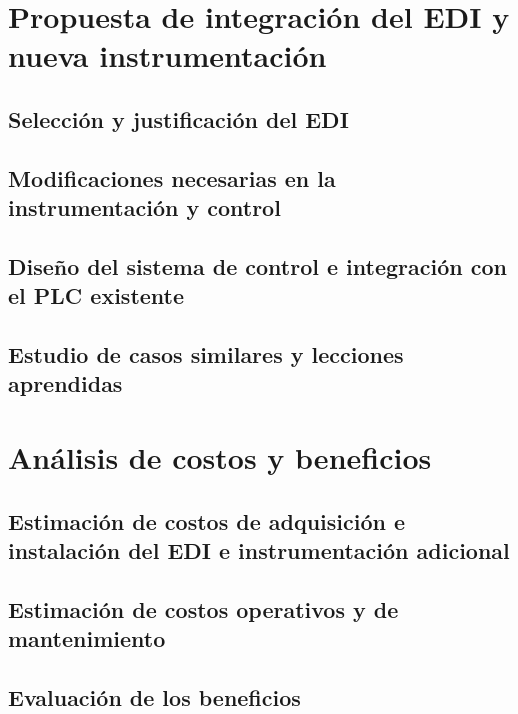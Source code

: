 \documentclass[
	spanish, %
	letterpaper, oneside
]{book}
\begin{document}
\templateIndex

\templateFinalcfg










\chapter{Propuesta de integración del EDI y nueva instrumentación}
\section{Selección y justificación del EDI}
\section{Modificaciones necesarias en la instrumentación y control}
\section{Diseño del sistema de control e integración con el PLC existente}
\section{Estudio de casos similares y lecciones aprendidas}

\chapter{Análisis de costos y beneficios}
\section{Estimación de costos de adquisición e instalación del EDI e instrumentación adicional}
\section{Estimación de costos operativos y de mantenimiento}
\section{Evaluación de los beneficios}
\end{document}

